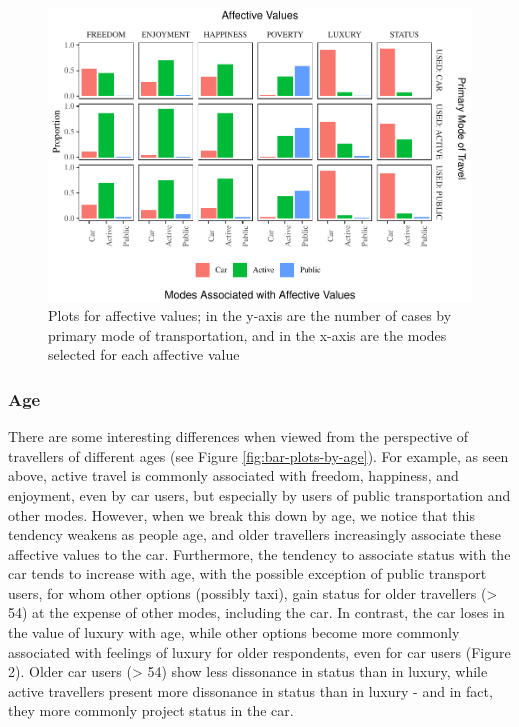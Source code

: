 \documentclass[]{elsarticle} %
\makeatletter
\def\maxwidth{\ifdim\Gin@nat@width>\linewidth\linewidth
\else\Gin@nat@width\fi}
\let\Oldincludegraphics\includegraphics
\renewcommand{\includegraphics}[1]{\Oldincludegraphics[width=\maxwidth]{#1}}
\makeatother
\begin{document}
\begin{figure}
\centering
\includegraphics{Dissonance_Santiago_v2_files/figure-latex/figure-bar-plots-by-attribute-1.pdf}
\caption{\label{fig:bar-plots-by-attribute}Plots for affective values;
in the y-axis are the number of cases by primary mode of transportation,
and in the x-axis are the modes selected for each affective value}
\end{figure}

\hypertarget{age-1}{%
\subsubsection{Age}\label{age-1}}

There are some interesting differences when viewed from the perspective
of travellers of different ages (see Figure \ref{fig:bar-plots-by-age}).
For example, as seen above, active travel is commonly associated with
freedom, happiness, and enjoyment, even by car users, but especially by
users of public transportation and other modes. However, when we break
this down by age, we notice that this tendency weakens as people age,
and older travellers increasingly associate these affective values to
the car. Furthermore, the tendency to associate status with the car
tends to increase with age, with the possible exception of public
transport users, for whom other options (possibly taxi), gain status for
older travellers (\textgreater{} 54) at the expense of other modes,
including the car. In contrast, the car loses in the value of luxury
with age, while other options become more commonly associated with
feelings of luxury for older respondents, even for car users (Figure 2).
Older car users (\textgreater{} 54) show less dissonance in status than
in luxury, while active travellers present more dissonance in status
than in luxury - and in fact, they more commonly project status in the
car.
\end{document}
